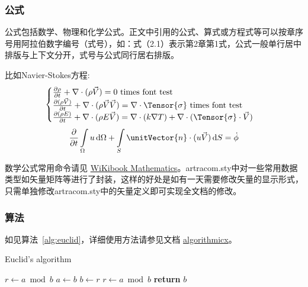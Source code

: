 \subsubsection{公式}
公式包括数学、物理和化学公式。正文中引用的公式、算式或方程式等可以按章序号用阿拉伯数字编号（式号），如：式（2.1）表示第2章第1式，公式一般单行居中排版与上下文分开，式号与公式同行居右排版。

比如Navier-Stokes方程:
\begin{equation} \label{eq:ns}
    \begin{cases}
        \frac{\partial \rho}{\partial t} + \nabla\cdot(\rho\Vec{V}) = 0 \ \mathrm{times\ font\ test}\\
        \frac{\partial (\rho\Vec{V})}{\partial t} + \nabla\cdot(\rho\Vec{V}\Vec{V}) = \nabla\cdot\Tensor{\sigma} \ \text{times font test}\\
        \frac{\partial (\rho E)}{\partial t} + \nabla\cdot(\rho E\Vec{V}) = \nabla\cdot(k\nabla T) + \nabla\cdot(\Tensor{\sigma}\cdot\Vec{V})
    \end{cases}
\end{equation}
\begin{equation}
    \frac{\partial }{\partial t}\int\limits_{\Omega} u \, \mathrm{d}\Omega + \int\limits_{S} \unitVector{n}\cdot(u\Vec{V}) \, \mathrm{d}S = \dot{\phi}
\end{equation}

数学公式常用命令请见 \href{https://en.wikibooks.org/wiki/LaTeX/Mathematics}{WiKibook Mathematics}。artracom.sty中对一些常用数据类型如矢量矩阵等进行了封装，这样的好处是如有一天需要修改矢量的显示形式，只需单独修改artracom.sty中的矢量定义即可实现全文档的修改。

\subsubsection{算法}

如见算法~\ref{alg:euclid}，详细使用方法请参见文档 \href{https://ctan.org/pkg/algorithmicx?lang=en}{algorithmicx}。

\begin{algorithm}[!htbp]
    \small
    \caption{Euclid's algorithm}\label{alg:euclid}
    \begin{algorithmic}[1]
        \State $r\gets a\bmod b$
        \State $a\gets b$
        \State $b\gets r$
        \State $r\gets a\bmod b$
        \EndWhile\label{euclidendwhile}
        \State \textbf{return} $b$
        \EndProcedure
    \end{algorithmic}
\end{algorithm}

